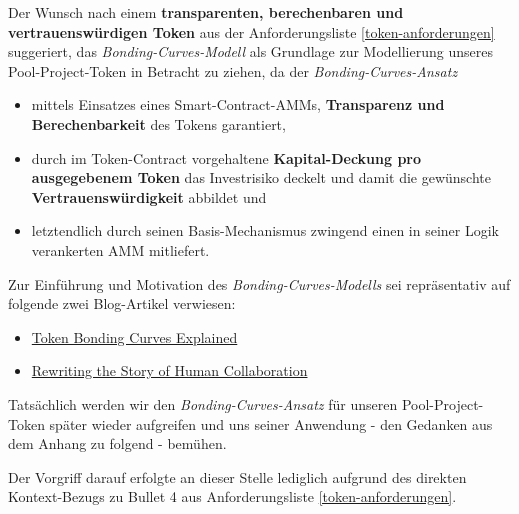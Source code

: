 \begin{Konzept}
\label{bcm}
\vspace{0.2cm}

Der Wunsch nach einem \textbf{transparenten, berechenbaren und vertrauenswürdig\-en Token} aus der Anforderungsliste \ref{token-anforderungen} suggeriert, das \textit{Bonding-Curves-Modell} als Grundlage zur Modellierung unseres Pool-Project-Token in Betracht zu ziehen, da der \textit{Bonding-Curves-Ansatz}

\begin{itemize}
	\item mittels Einsatzes eines Smart-Contract-AMMs, \textbf{Transparenz und Berechenbarkeit} des Tokens garantiert,
	\item durch im Token-Contract vorgehaltene \textbf{Kapital-Deckung pro ausgegebenem Token} das Investrisiko deckelt und damit die gewünschte \textbf{Vertrauenswürdig\-keit} abbildet und
	\item letztendlich durch seinen Basis-Mechanismus zwingend einen in seiner Logik verankerten AMM mitliefert.
\end{itemize}

\vspace{0.5cm}

Zur Einführung und Motivation des \textit{Bonding-Curves-Modells} sei repräsentativ auf folgende zwei Blog-Artikel verwiesen:

\begin{itemize}
	\item \href{https://medium.com/coinmonks/token-bonding-curves-explained-7a9332198e0e}{Token Bonding Curves Explained}
	\item \href{https://blog.goodaudience.com/rewriting-the-story-of-human-collaboration-c33a8a4cd5b8}{Rewriting the Story of Human Collaboration}
\end{itemize}

\vspace{0.5cm}

Tatsächlich werden wir den \textit{Bonding-Curves-Ansatz} für unseren Pool-Project-Token später wieder aufgreifen und uns seiner Anwendung - den Gedanken aus dem Anhang zu  folgend - bemühen.

\vspace{0.3cm}

Der Vorgriff darauf erfolgte an dieser Stelle lediglich aufgrund des direkten Kontext-Bezugs zu Bullet 4 aus Anforderungsliste \ref{token-anforderungen}.

\end{Konzept}

